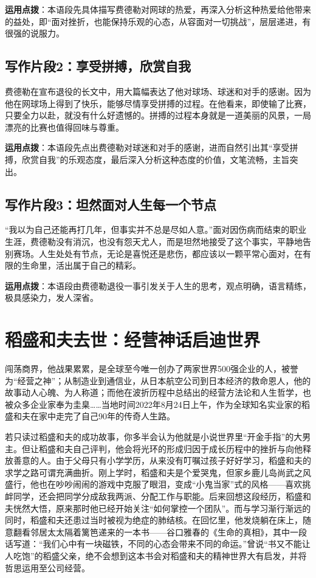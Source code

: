 \textbf{运用点拨}：本语段先具体描写费德勒对网球的热爱，再深入分析这种热爱给他带来的益处，即“面对挫折，也能保持乐观的心态，从容面对一切挑战”，层层递进，有很强的说服力。

\subsection*{写作片段2：享受拼搏，欣赏自我}

费德勒在宣布退役的长文中，用大篇幅表达了他对球场、球迷和对手的感谢。因为他在网球场上得到了快乐，能够尽情享受拼搏的过程。在他看来，即使输了比赛，只要全力以赴，就没有什么好遗憾的。拼搏的过程本身就是一道美丽的风景，一局漂亮的比赛也值得回味与尊重。

\textbf{运用点拨}：本语段先点出费德勒对球迷和对手的感谢，进而自然引出其“享受拼搏，欣赏自我”的乐观态度，最后深入分析这种态度的价值，文笔流畅，主旨突出。

\subsection*{写作片段3：坦然面对人生每一个节点}

“我以为自己还能再打几年，但事实并不总是尽如人意。”面对因伤病而结束的职业生涯，费德勒没有消沉，也没有怨天尤人，而是坦然地接受了这个事实，平静地告别赛场。人生处处有节点，无论是喜悦还是悲伤，都应该以一颗平常心面对，在有限的生命里，活出属于自己的精彩。

\textbf{运用点拨}：本语段由费德勒退役一事引发关于人生的思考，观点明确，语言精练，极具感染力，发人深省。

\clearpage
\section*{稻盛和夫去世：经营神话启迪世界}

闯荡商界，他战果累累，是全球至今唯一创办了两家世界500强企业的人，被誉为“经营之神”；从制造业到通信业，从日本航空公司到日本经济的救命恩人，他的故事动人心魄、为人称道；而他在波折历程中总结出的经营方法论和人生哲学，也被众多企业家奉为圭臬……当地时间2022年8月24日上午，作为全球知名实业家的稻盛和夫在家中走完了自己90年的传奇人生路。

若只读过稻盛和夫的成功故事，你多半会认为他就是小说世界里“开金手指”的大男主。但让稻盛和夫自己评判，他会将光环的形成归因于成长历程中的挫折与向他释放善意的人。由于父母只有小学学历，从来没有叮嘱过孩子好好学习，稻盛和夫的求学之路可谓充满曲折。刚上学时，稻盛和夫是个爱哭鬼，但家乡鹿儿岛尚武之风盛行，他也在吵吵闹闹的游戏中克服了眼泪，变成“小鬼当家”式的风格——喜欢挑衅同学，还会把同学分成敌我两派、分配工作与职能。后来回想这段经历，稻盛和夫恍然大悟，原来那时他已经开始关注“如何掌控一个团队”。而与学习渐行渐远的同时，稻盛和夫还患过当时被视为绝症的肺结核。在回忆里，他发烧躺在床上，随意翻看邻居太太隔着篱笆递来的一本书——谷口雅春的《生命的真相》，其中一段话写道：“我们心中有一块磁铁，不同的心态会带来不同的命运。”曾说“书又不能让人吃饱”的稻盛父亲，绝不会想到这本书会对稻盛和夫的精神世界大有启发，并将哲思运用至公司经营。

